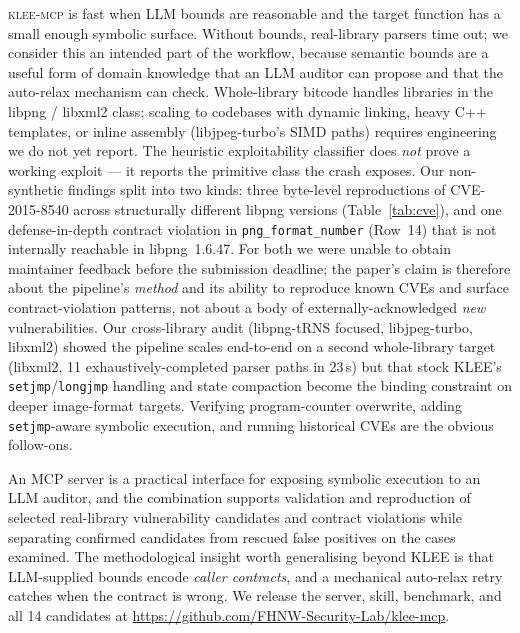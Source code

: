 \documentclass[3p,times,procedia]{elsarticle}
\begin{document}
\textsc{klee-mcp} is fast when LLM bounds are reasonable and the target function has a small enough symbolic surface. Without bounds, real-library parsers time out; we consider this an intended part of the workflow, because semantic bounds are a useful form of domain knowledge that an LLM auditor can propose and that the auto-relax mechanism can check. Whole-library bitcode handles libraries in the libpng / libxml2 class; scaling to codebases with dynamic linking, heavy C++ templates, or inline assembly (libjpeg-turbo's SIMD paths) requires engineering we do not yet report. The heuristic exploitability classifier does \emph{not} prove a working exploit --- it reports the primitive class the crash exposes. Our non-synthetic findings split into two kinds: three byte-level reproductions of CVE-2015-8540 across structurally different libpng versions (Table~\ref{tab:cve}), and one defense-in-depth contract violation in \texttt{png\_format\_number} (Row~14) that is not internally reachable in libpng~1.6.47. For both we were unable to obtain maintainer feedback before the submission deadline; the paper's claim is therefore about the pipeline's \emph{method} and its ability to reproduce known CVEs and surface contract-violation patterns, not about a body of externally-acknowledged \emph{new} vulnerabilities. Our cross-library audit (libpng-tRNS focused, libjpeg-turbo, libxml2) showed the pipeline scales end-to-end on a second whole-library target (libxml2, 11 exhaustively-completed parser paths in 23\,s) but that stock KLEE's \texttt{setjmp}/\texttt{longjmp} handling and state compaction become the binding constraint on deeper image-format targets. Verifying program-counter overwrite, adding \texttt{setjmp}-aware symbolic execution, and running historical CVEs are the obvious follow-ons.

An MCP server is a practical interface for exposing symbolic execution to an LLM auditor, and the combination supports validation and reproduction of selected real-library vulnerability candidates and contract violations while separating confirmed candidates from rescued false positives on the cases examined. The methodological insight worth generalising beyond KLEE is that LLM-supplied bounds encode \emph{caller contracts}, and a mechanical auto-relax retry catches when the contract is wrong. We release the server, skill, benchmark, and all 14 candidates at \url{https://github.com/FHNW-Security-Lab/klee-mcp}.
\end{document}
